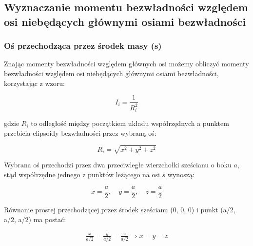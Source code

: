 \documentclass[a4paper,12pt]{article}
\begin{document}
\subsection{Wyznaczanie momentu bezwładności względem osi niebędących głównymi osiami bezwładności}


\subsubsection{Oś przechodząca przez środek masy (s)}

Znając momenty bezwładności względem głównych osi możemy obliczyć momenty bezwładności względem osi niebędących głównymi osiami bezwładności, korzystając z wzoru:

\begin{equation} \label{eq:moment_bezwladnosci_elipsoida}
    I_i = \frac{1}{R_i^2}
\end{equation}

gdzie $R_i$ to odległość między początkiem układu współrzędnych a punktem przebicia elipsoidy bezwładności przez wybraną oś:

\begin{equation} \label{eq:odleglosc_od_srodka_masy_do_punktu_przebicia_osi}
    R_i = \sqrt{x^2 + y^2 + z^2}
\end{equation}

Wybrana oś przechodzi przez dwa przeciwległe wierzchołki sześcianu o boku $a$, stąd współrzędne jednego z punktów leżącego na osi $s$ wynoszą:

\begin{equation*}
    x = \frac{a}{2}, \quad
    y = \frac{a}{2}, \quad
    z = \frac{a}{2}
\end{equation*}

Równanie prostej przechodzącej przez środek sześcianu (0, 0, 0) i punkt (a/2, a/2, a/2) ma postać:

\begin{align} \label{eq:prosta_przechodzaca_przez_srodek_szesciany}
    \frac{x}{a/2} = \frac{y}{a/2} = \frac{z}{a/2}
    \Rightarrow
    x = y = z
\end{align}
\end{document}
